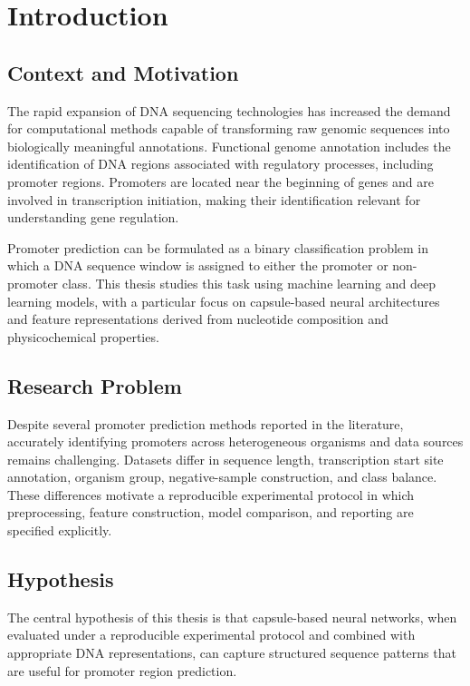 \chapter{Introduction}\label{chap:introduction}

\section{Context and Motivation}\label{sec:intro-context}

The rapid expansion of DNA sequencing technologies has increased the demand for
computational methods capable of transforming raw genomic sequences into
biologically meaningful annotations. Functional genome annotation includes the
identification of DNA regions associated with regulatory processes, including
promoter regions. Promoters are located near the beginning of genes and are
involved in transcription initiation, making their identification relevant for
understanding gene regulation.

Promoter prediction can be formulated as a binary classification problem in
which a DNA sequence window is assigned to either the promoter or non-promoter
class. This thesis studies this task using machine learning and deep learning
models, with a particular focus on capsule-based neural architectures and
feature representations derived from nucleotide composition and physicochemical
properties.

\section{Research Problem}\label{sec:intro-problem}

Despite several promoter prediction methods reported in the literature,
accurately identifying promoters across heterogeneous organisms and data sources
remains challenging. Datasets differ in sequence length, transcription start
site annotation, organism group, negative-sample construction, and class balance.
These differences motivate a reproducible experimental protocol in which preprocessing, feature construction, model comparison, and reporting are specified explicitly.

\section{Hypothesis}\label{sec:intro-hypothesis}

The central hypothesis of this thesis is that capsule-based neural networks,
when evaluated under a reproducible experimental protocol and combined with
appropriate DNA representations, can capture structured sequence patterns that
are useful for promoter region prediction.

